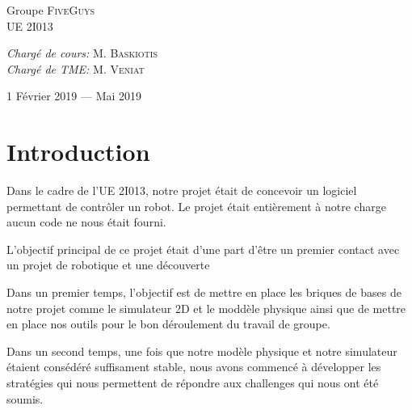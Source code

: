 \documentclass[12pt, openany]{article}
\begin{document}
\begin{titlepage}
\begin{sffamily}
\begin{center}
    \begin{minipage}{0.4\textwidth}
      \begin{flushleft} \large
        Groupe \textsc{FiveGuys}\\
        UE 2I013\\
      \end{flushleft}
    \end{minipage}
    \begin{minipage}{0.4\textwidth}
      \begin{flushright} \large
        \emph{Chargé de cours:} M. \textsc{Baskiotis}\\
        \emph{Chargé de TME:} M. \textsc{Veniat}
      \end{flushright}
    \end{minipage}

    \vfill

    {\large 1\ier{} Février 2019 — Mai 2019}

  \end{center}
  \end{sffamily}
\end{titlepage}

\tableofcontents
\newpage

\section{Introduction}
Dans le cadre de l'UE 2I013, notre projet était de concevoir un logiciel permettant de contrôler un robot. Le projet était entièrement à notre charge aucun code ne nous était fourni.

L'objectif principal de ce projet était d'une part d'être un premier contact avec un projet de robotique et une découverte

Dans un premier temps, l'objectif est de mettre en place les briques de bases de notre projet comme le simulateur 2D et le moddèle physique ainsi que de mettre en place nos outils pour le bon déroulement du travail de groupe.

Dans un second temps, une fois que notre modèle physique et notre simulateur étaient consédéré suffisament stable, nous avons commencé à développer les stratégies qui nous permettent de répondre aux challenges qui nous ont été soumis.
\end{document}
